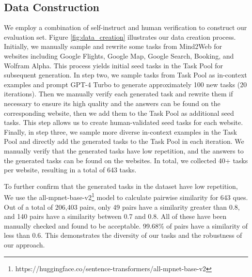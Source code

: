 \documentclass[11pt]{article}
\newcommand{\kaixin}[2][]{\todo[color=green,size=\scriptsize,fancyline,caption={},#1]{KM:#2}}
\newcommand{\dai}[2][]{\todo[color=cyan,size=\scriptsize,fancyline,caption={},#1]{DAI:#2}}
\begin{document}
\subsection{Data Construction}%
We employ a combination of self-instruct \citep{wang2022self} and human verification to construct our evaluation set. Figure \ref{fig:data_creation} illustrates our data creation process. Initially, we manually sample and rewrite some tasks from Mind2Web \citep{yin2023lumos, deng2023mind2web} for websites including Google Flights, Google Map, Google Search, Booking, and Wolfram Alpha. 
This process yields initial seed tasks in the Task Pool for subsequent generation. 
In step two, we sample tasks from Task Pool as in-context examples \citep{dong2022survey} and prompt GPT-4 Turbo to generate approximately 100 new tasks (20 iterations). Then we manually verify each generated task and rewrite them if necessary to ensure its high quality and the answers can be found on the corresponding website, then we add them to the Task Pool as additional seed tasks. This step allows us to create human-validated seed tasks for each website. 
Finally, in step three, we sample more diverse in-context examples in the Task Pool and directly add the generated tasks to the Task Pool in each iteration. We manually verify that the generated tasks have low repetition, and the answers to the generated tasks can be found on the websites.
In total, we collected 40+ tasks per website, resulting in a total of 643 tasks.

To further confirm that the generated tasks in the dataset have low repetition, We use the all-mpnet-base-v2\footnote{https://huggingface.co/sentence-transformers/all-mpnet-base-v2} model to calculate pairwise similarity for 643 ques. Out of a total of 206,403 pairs, only 49 pairs have a similarity greater than 0.8, and 140 pairs have a similarity between 0.7 and 0.8. All of these have been manually checked and found to be acceptable. 99.68\% of pairs have a similarity of less than 0.6. This demonstrates the diversity of our tasks and the robustness of our approach.
\end{document}
